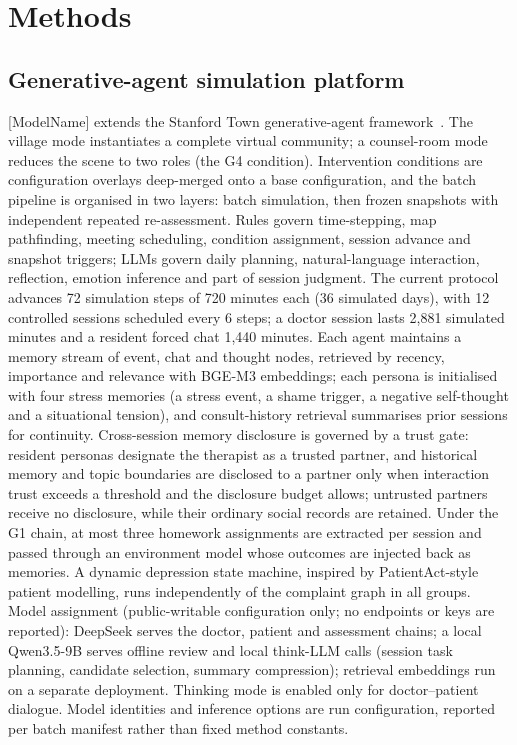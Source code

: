 \documentclass[sn-nature,pdflatex]{sn-jnl}
\begin{document}
\section{Methods}\label{sec:methods}

\subsection*{Generative-agent simulation platform}

[ModelName] extends the Stanford Town generative-agent framework~\cite{park2023}. The village mode instantiates a complete virtual community; a counsel-room mode reduces the scene to two roles (the G4 condition). Intervention conditions are configuration overlays deep-merged onto a base configuration, and the batch pipeline is organised in two layers: batch simulation, then frozen snapshots with independent repeated re-assessment. Rules govern time-stepping, map pathfinding, meeting scheduling, condition assignment, session advance and snapshot triggers; LLMs govern daily planning, natural-language interaction, reflection, emotion inference and part of session judgment. The current protocol advances 72 simulation steps of 720 minutes each (36 simulated days), with 12 controlled sessions scheduled every 6 steps; a doctor session lasts 2,881 simulated minutes and a resident forced chat 1,440 minutes. Each agent maintains a memory stream of event, chat and thought nodes, retrieved by recency, importance and relevance with BGE-M3 embeddings; each persona is initialised with four stress memories (a stress event, a shame trigger, a negative self-thought and a situational tension), and consult-history retrieval summarises prior sessions for continuity. Cross-session memory disclosure is governed by a trust gate: resident personas designate the therapist as a trusted partner, and historical memory and topic boundaries are disclosed to a partner only when interaction trust exceeds a threshold and the disclosure budget allows; untrusted partners receive no disclosure, while their ordinary social records are retained. Under the G1 chain, at most three homework assignments are extracted per session and passed through an environment model whose outcomes are injected back as memories. A dynamic depression state machine, inspired by PatientAct-style patient modelling, runs independently of the complaint graph in all groups. Model assignment (public-writable configuration only; no endpoints or keys are reported): DeepSeek serves the doctor, patient and assessment chains; a local Qwen3.5-9B serves offline review and local think-LLM calls (session task planning, candidate selection, summary compression); retrieval embeddings run on a separate deployment. Thinking mode is enabled only for doctor--patient dialogue. Model identities and inference options are run configuration, reported per batch manifest rather than fixed method constants.
\end{document}
